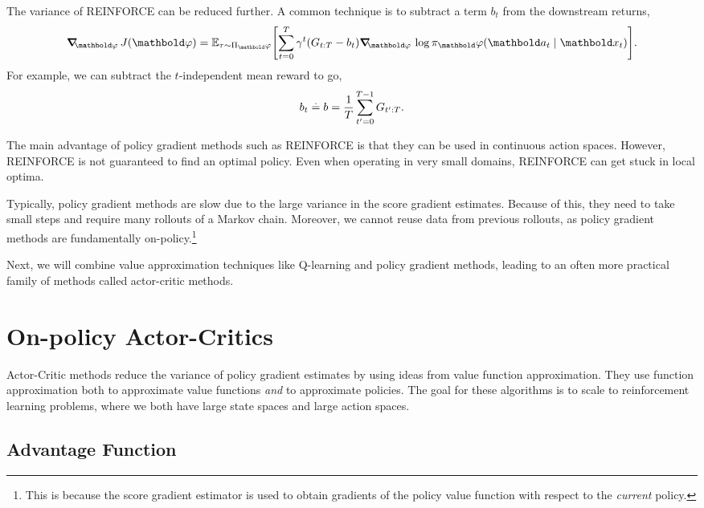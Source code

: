 The variance of REINFORCE can be reduced further.
A common technique is to subtract a term $b_t$ from the downstream returns, \begin{align}
  \grad_\vvarphi \j{\vvarphi} = \E[\tau \sim \altpi_\vvarphi]{\sum_{t=0}^T \gamma^t (G_{t:T} - b_t) \grad_\vvarphi \log \pi_\vvarphi(\va_t \mid \vx_t)}.
\end{align}
For example, we can subtract the $t$-independent mean reward to go, \begin{align}
  b_t \overset{.}{=} b = \frac{1}{T} \sum_{t'=0}^{T-1} G_{t':T}.
\end{align}

The main advantage of policy gradient methods such as REINFORCE is that they can be used in continuous action spaces.
However, REINFORCE is not guaranteed to find an optimal policy.
Even when operating in very small domains, REINFORCE can get stuck in local optima.

Typically, policy gradient methods are slow due to the large variance in the score gradient estimates.
Because of this, they need to take small steps and require many rollouts of a Markov chain.
Moreover, we cannot reuse data from previous rollouts, as policy gradient methods are fundamentally on-policy.\footnote{This is because the score gradient estimator is used to obtain gradients of the policy value function with respect to the \emph{current} policy.}

Next, we will combine value approximation techniques like Q-learning and policy gradient methods, leading to an often more practical family of methods called actor-critic methods.


\section{On-policy Actor-Critics}\label{sec:mfarl:actor_critic_methods}

Actor-Critic methods reduce the variance of policy gradient estimates by using ideas from value function approximation.
They use function approximation both to approximate value functions \emph{and} to approximate policies.
The goal for these algorithms is to scale to reinforcement learning problems, where we both have large state spaces and large action spaces.

\subsection{Advantage Function}

